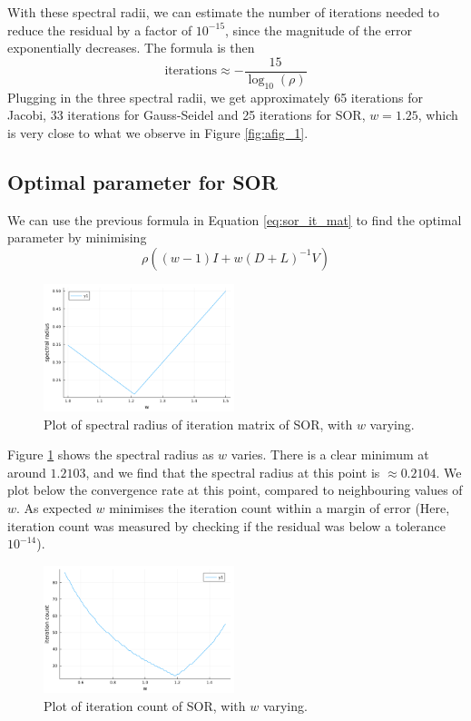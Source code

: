 \documentclass{article}
\numberwithin{equation}{section}
\theoremstyle{definition}
\begin{document}
With these spectral radii, we can estimate the number of iterations needed to reduce the residual by a factor of $10^{-15}$, since the magnitude of the error exponentially decreases. The formula is then
\begin{equation}
    \text{iterations} \approx -\frac{15}{\log_{10}(\rho)}
\end{equation}
Plugging in the three spectral radii, we get approximately 65 iterations for Jacobi, 33 iterations for Gauss-Seidel and 25 iterations for SOR, $w=1.25$, which is very close to what we observe in Figure \ref{fig:afig_1}.

\subsection{Optimal parameter for SOR}
We can use the previous formula in Equation \eqref{eq:sor_it_mat} to find the optimal parameter by minimising
\begin{equation}
    \rho((w-1)I + w(D+L)^{-1}V)
\end{equation}

\begin{figure}[H]
    \centering
    \includegraphics[width=0.496\textwidth]{fig2.png}
    \caption{Plot of spectral radius of iteration matrix of SOR, with $w$ varying.}
    \label{fig:afig_2}
\end{figure}
Figure \ref{fig:afig_2} shows the spectral radius as $w$ varies. There is a clear minimum at around $1.2103$, and we find that the spectral radius at this point is $\approx 0.2104$. We plot below the convergence rate at this point, compared to neighbouring values of $w$. As expected $w$ minimises the iteration count within a margin of error (Here, iteration count was measured by checking if the residual was below a tolerance $10^{-14}$).

\begin{figure}[H]
    \centering
    \includegraphics[width=0.496\textwidth]{fig2h.png}
    \caption{Plot of iteration count of SOR, with $w$ varying.}
    \label{fig:fig2h}
\end{figure}
\end{document}

